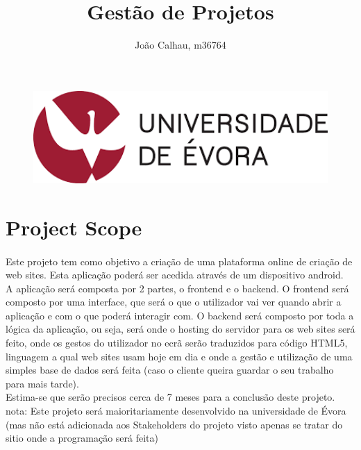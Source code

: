 \documentclass[a4paper]{article}
\title{Gestão de Projetos}
\author{João Calhau, m36764}
\begin{document}
\maketitle

\vfill

\begin{figure}[!ht]
\centering
\includegraphics[width=120mm]{uni.png}
\end{figure}

\vfill

\newpage

\tableofcontents

\newpage

\section{Project Scope}
\paragraph{}

\noindent Este projeto tem como objetivo a criação de uma plataforma online de criação de web sites. Esta aplicação poderá ser acedida através de um dispositivo android. \\
A aplicação será composta por 2 partes, o frontend e o backend. O frontend será composto por uma interface, que será o que o utilizador vai ver quando abrir a aplicação e com o que poderá interagir com. O backend será composto por toda a lógica da aplicação, ou seja, será onde o hosting do servidor para os web sites será feito, onde os gestos do utilizador no ecrã serão traduzidos para código HTML5, linguagem a qual web sites usam hoje em dia e onde a gestão e utilização de uma simples base de dados será feita (caso o cliente queira guardar o seu trabalho para mais tarde). \\
Estima-se que serão precisos cerca de 7 meses para a conclusão deste projeto.\\

nota: Este projeto será maioritariamente desenvolvido na universidade de Évora (mas não está adicionada aos Stakeholders do projeto visto apenas se tratar do sitio onde a programação será feita) 
\end{document}
